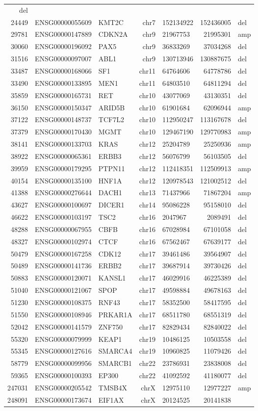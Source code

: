 \documentclass[]{article}
\begin{document}
\begin{longtable}[]{@{}rrlrlrl@{}}
del\tabularnewline
24449 & ENSG00000055609 & KMT2C & chr7 & 152134922 & 152436005 &
del\tabularnewline
29781 & ENSG00000147889 & CDKN2A & chr9 & 21967753 & 21995301 &
amp\tabularnewline
30060 & ENSG00000196092 & PAX5 & chr9 & 36833269 & 37034268 &
del\tabularnewline
31516 & ENSG00000097007 & ABL1 & chr9 & 130713946 & 130887675 &
del\tabularnewline
33487 & ENSG00000168066 & SF1 & chr11 & 64764606 & 64778786 &
del\tabularnewline
33490 & ENSG00000133895 & MEN1 & chr11 & 64803510 & 64811294 &
del\tabularnewline
35859 & ENSG00000165731 & RET & chr10 & 43077069 & 43130351 &
del\tabularnewline
36150 & ENSG00000150347 & ARID5B & chr10 & 61901684 & 62096944 &
amp\tabularnewline
37122 & ENSG00000148737 & TCF7L2 & chr10 & 112950247 & 113167678 &
del\tabularnewline
37379 & ENSG00000170430 & MGMT & chr10 & 129467190 & 129770983 &
amp\tabularnewline
38141 & ENSG00000133703 & KRAS & chr12 & 25204789 & 25250936 &
amp\tabularnewline
38922 & ENSG00000065361 & ERBB3 & chr12 & 56076799 & 56103505 &
del\tabularnewline
39959 & ENSG00000179295 & PTPN11 & chr12 & 112418351 & 112509913 &
amp\tabularnewline
40154 & ENSG00000135100 & HNF1A & chr12 & 120978543 & 121002512 &
del\tabularnewline
41388 & ENSG00000276644 & DACH1 & chr13 & 71437966 & 71867204 &
amp\tabularnewline
43627 & ENSG00000100697 & DICER1 & chr14 & 95086228 & 95158010 &
del\tabularnewline
46622 & ENSG00000103197 & TSC2 & chr16 & 2047967 & 2089491 &
del\tabularnewline
48288 & ENSG00000067955 & CBFB & chr16 & 67028984 & 67101058 &
del\tabularnewline
48327 & ENSG00000102974 & CTCF & chr16 & 67562467 & 67639177 &
del\tabularnewline
50479 & ENSG00000167258 & CDK12 & chr17 & 39461486 & 39564907 &
del\tabularnewline
50489 & ENSG00000141736 & ERBB2 & chr17 & 39687914 & 39730426 &
del\tabularnewline
50883 & ENSG00000120071 & KANSL1 & chr17 & 46029916 & 46225389 &
del\tabularnewline
51040 & ENSG00000121067 & SPOP & chr17 & 49598884 & 49678163 &
del\tabularnewline
51230 & ENSG00000108375 & RNF43 & chr17 & 58352500 & 58417595 &
del\tabularnewline
51550 & ENSG00000108946 & PRKAR1A & chr17 & 68511780 & 68551319 &
del\tabularnewline
52042 & ENSG00000141579 & ZNF750 & chr17 & 82829434 & 82840022 &
del\tabularnewline
55320 & ENSG00000079999 & KEAP1 & chr19 & 10486125 & 10503558 &
del\tabularnewline
55345 & ENSG00000127616 & SMARCA4 & chr19 & 10960825 & 11079426 &
del\tabularnewline
58779 & ENSG00000099956 & SMARCB1 & chr22 & 23786931 & 23838008 &
del\tabularnewline
59365 & ENSG00000100393 & EP300 & chr22 & 41092592 & 41180077 &
del\tabularnewline
247031 & ENSG00000205542 & TMSB4X & chrX & 12975110 & 12977227 &
amp\tabularnewline
248091 & ENSG00000173674 & EIF1AX & chrX & 20124525 & 20141838 &

\end{longtable}
\end{document}
